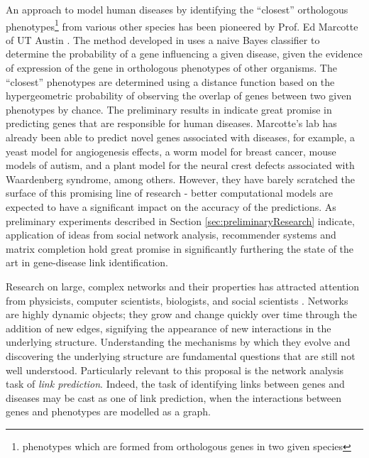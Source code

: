 An approach to model human diseases by identifying  the ``closest'' orthologous phenotypes\footnote{phenotypes which are formed from orthologous genes in two given species} from various other species has been pioneered by Prof. Ed Marcotte of UT Austin \cite{McGaryOrthologousPhenotypes}. The method developed in \cite{McGaryOrthologousPhenotypes, McGarySI} uses a naive Bayes classifier to determine the probability of a gene influencing a given disease, given the evidence of expression of the gene in orthologous phenotypes of other organisms. The ``closest'' phenotypes are determined using a distance function based on the hypergeometric probability of observing the overlap of genes between two given phenotypes by chance. The preliminary results in \cite{McGaryOrthologousPhenotypes} indicate great promise in predicting genes that are responsible for human diseases. Marcotte's lab has already been able to predict novel genes associated with diseases, for example, a yeast model for angiogenesis effects, a worm model for breast cancer, mouse models of autism, and a plant model for the neural crest defects associated with Waardenberg syndrome, among others\cite{McGaryOrthologousPhenotypes}. However, they have barely scratched the surface of this promising line of research - better computational models are expected to have a significant impact on the accuracy of the predictions. As preliminary experiments described in Section \ref{sec:preliminaryResearch} indicate, application of ideas from social network analysis, recommender systems and matrix completion hold great promise in significantly furthering the state of the art in gene-disease link identification.

Research on large, complex networks and their properties has attracted attention from physicists, computer scientists, biologists, and social scientists \cite{internet, smallworldPNAS, mat1,mat2, nn, collab}. Networks are highly dynamic objects; they grow and change quickly over time through the addition of new edges, signifying the appearance of new interactions in the underlying structure. Understanding the mechanisms by which they evolve and discovering the underlying structure are  fundamental questions that are still not well understood. Particularly relevant to this proposal is the network analysis task of \emph{link prediction}. Indeed, the task of identifying links between genes and diseases may be cast as one of link prediction, when the interactions between genes and phenotypes are modelled as a graph.

